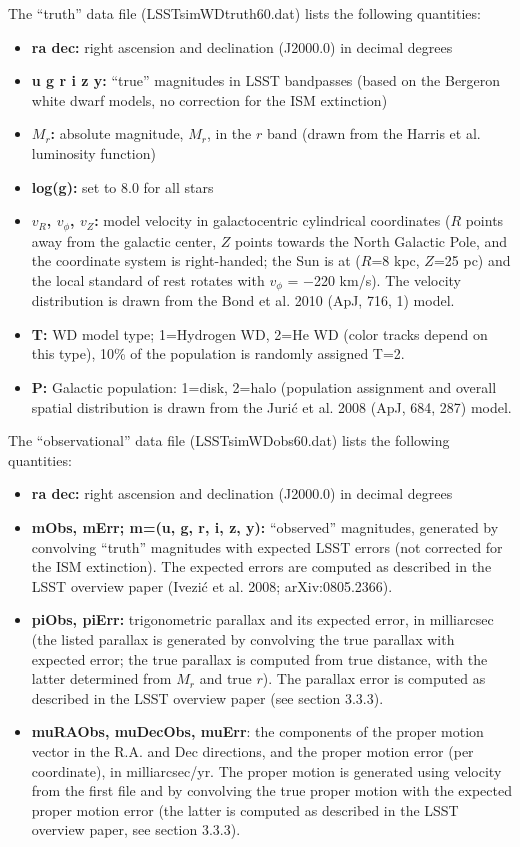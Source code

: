 The “truth” data file (LSSTsimWDtruth60.dat) lists the following quantities:
\begin{itemize}
\item {\bf ra dec:} right ascension and declination (J2000.0)
 in decimal degrees 
\item {\bf u g r i z y:} ``true” magnitudes in LSST bandpasses (based on the
Bergeron white dwarf models, no correction for the ISM extinction)
\item {\bf $M_r$:} absolute magnitude, $M_r$, in the $r$ band (drawn from the 
    Harris et al. luminosity function)
\item {\bf log(g):} set to 8.0 for all stars
\item {\bf $v_R$, $v_\phi$, $v_Z$:} model velocity in galactocentric cylindrical coordinates 
($R$ points away from the galactic center, $Z$ points towards the North Galactic Pole, and 
the coordinate system is right-handed; the Sun is at ($R$=8 kpc, $Z$=25 pc) and the local 
standard of rest rotates with $v_\phi$ = $−$220 km/s). The velocity distribution is drawn 
from the Bond et al. 2010 (ApJ, 716, 1) model.
\item {\bf T:} WD model type; 1=Hydrogen WD, 2=He WD (color tracks depend on this type), 
10\% of the population is randomly assigned T=2.
\item {\bf P:} Galactic population: 1=disk, 2=halo (population assignment and overall spatial 
distribution is drawn from the Juri\'{c} et al. 2008 (ApJ, 684, 287) model.
\end{itemize}

The “observational” data file (LSSTsimWDobs60.dat) lists the following quantities:
\begin{itemize}
\item {\bf ra dec:} right ascension and declination (J2000.0)  in decimal degrees 
\item {\bf mObs, mErr; m=(u, g, r, i, z, y):} ``observed” magnitudes, generated by convolving 
“truth” magnitudes with expected LSST errors (not corrected for the ISM extinction). The expected 
errors are computed as described in the LSST overview paper (Ivezi\'{c} et al. 2008; arXiv:0805.2366).
\item {\bf piObs, piErr:} trigonometric parallax and its expected error, in milliarcsec (the listed 
parallax is generated by convolving the true parallax with expected error; the true parallax is 
computed from true distance, with the latter determined from $M_r$ and true $r$). The parallax 
error is computed as described in the LSST overview paper (see section 3.3.3).
\item {\bf muRAObs, muDecObs, muErr}: the components of the proper motion vector in the 
R.A. and Dec directions, and the proper motion error (per coordinate), in milliarcsec/yr. The proper 
motion is generated using velocity from the first file and by convolving the true proper motion 
with the expected proper motion error (the latter is computed as described in the LSST 
overview paper, see section 3.3.3).
\end{itemize}


